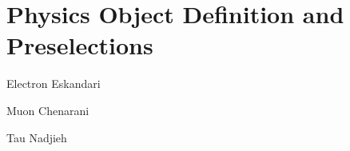 \section{Physics Object Definition and Preselections}
\label{sect:objdef}

Electron
Eskandari

Muon 
Chenarani

Tau
Nadjieh
